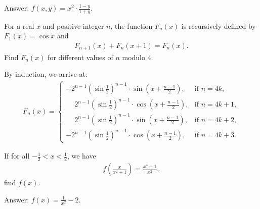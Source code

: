 \documentclass[12pt,a4paper]{memoir}
\theoremstyle{definition}
\begin{document}
\begin{solution}[name=Solution by Parviz Shahriari]
	Answer: $f(x,y)=x^2 \cdot \frac{1-y}{1+y}$.
\end{solution}



\begin{tcolorbox}
	\begin{question}
		For a real $x$ and positive integer $n$, the function $F_n(x)$ is recursively defined by $F_1(x)=\cos x$ and
		\begin{align*}
			F_{n+1}(x) + F_n(x+1) = F_n(x).
		\end{align*}
		Find $F_n(x)$ for different values of $n$ modulo $4$.
	\end{question}
\end{tcolorbox}

\begin{solution}[name=Solution by Parviz Shahriari]
	By induction, we arrive at:
	\begin{align*}
		F_n(x) = \begin{cases}
			-2^{n-1}\left(\sin \frac{1}{2}\right)^{n-1} \cdot \sin\left(x+ \frac{n-1}{2}\right), & \mbox{if } n=4k,\\
			\phantom{+}2^{n-1}\left(\sin \frac{1}{2}\right)^{n-1}\cdot \cos\left(x+ \frac{n-1}{2}\right), & \mbox{if } n=4k+1,\\
			\phantom{+}2^{n-1}\left(\sin \frac{1}{2}\right)^{n-1}\cdot \sin\left(x+ \frac{n-1}{2}\right), & \mbox{if } n=4k+2,\\
			-2^{n-1}\left(\sin \frac{1}{2}\right)^{n-1}\cdot \cos\left(x+ \frac{n-1}{2}\right), & \mbox{if } n=4k+3.
		\end{cases}
	\end{align*}
\end{solution}



\begin{tcolorbox}
	\begin{question}
		If for all $-\frac{1}{2} < x < \frac{1}{2}$, we have
		\begin{align*}
			f\left(\frac{x}{x^2+1}\right) = \frac{x^4+1}{x^2},
		\end{align*}
		find $f(x)$.
	\end{question}
\end{tcolorbox}

\begin{solution}[name=Solution by Parviz Shahriari]
	Answer: $f(x) = \frac{1}{x^2}-2$.
\end{solution}
\end{document}

